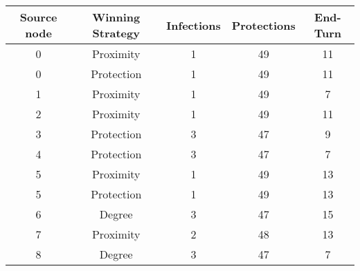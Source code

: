 \documentclass[results.tex]{subfiles}
\begin{document}
    \begin{center}
        \begin{tabular}{| c || c | c | c | c |}
            \hline
            {\bfseries Source node} & {\bfseries Winning Strategy} & {\bfseries Infections} & {\bfseries Protections}
            & {\bfseries End-Turn}
            \\  %
            \hline\hline
            0                       & Proximity                    & 1                      & 49                      & 11                   \\
            \hline
            0                       & Protection                   & 1                      & 49                      & 11                   \\
            \hline
            1                       & Proximity                    & 1                      & 49                      & 7                    \\
            \hline
            2                       & Proximity                    & 1                      & 49                      & 11                   \\
            \hline
            3                       & Protection                   & 3                      & 47                      & 9                    \\
            \hline
            4                       & Protection                   & 3                      & 47                      & 7                    \\
            \hline
            5                       & Proximity                    & 1                      & 49                      & 13                   \\
            \hline
            5                       & Protection                   & 1                      & 49                      & 13                   \\
            \hline
            6                       & Degree                       & 3                      & 47                      & 15                   \\
            \hline
            7                       & Proximity                    & 2                      & 48                      & 13                   \\
            \hline
            8                       & Degree                       & 3                      & 47                      & 7                    \\

\end{tabular}
\end{center}
\end{document}
